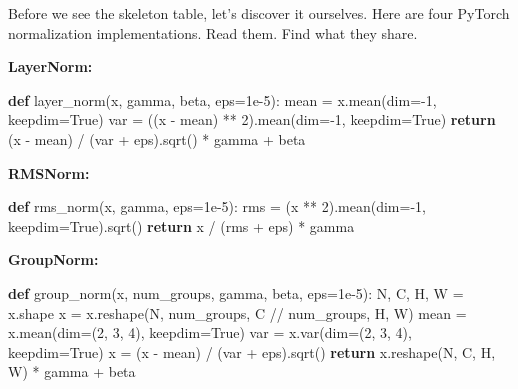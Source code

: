 \documentclass[11pt,titlepage]{article}
\newenvironment{Shaded}{}{}
\newcommand{\ControlFlowTok}[1]{\textcolor[rgb]{0.00,0.44,0.13}{\textbf{#1}}}
\newcommand{\DecValTok}[1]{\textcolor[rgb]{0.25,0.63,0.44}{#1}}
\newcommand{\FloatTok}[1]{\textcolor[rgb]{0.25,0.63,0.44}{#1}}
\newcommand{\KeywordTok}[1]{\textcolor[rgb]{0.00,0.44,0.13}{\textbf{#1}}}
\newcommand{\NormalTok}[1]{#1}
\newcommand{\OperatorTok}[1]{\textcolor[rgb]{0.40,0.40,0.40}{#1}}
\newcommand{\VariableTok}[1]{\textcolor[rgb]{0.10,0.09,0.49}{#1}}
\begin{document}
Before we see the skeleton table, let's discover it ourselves. Here are
four PyTorch normalization implementations. Read them. Find what they
share.

\textbf{LayerNorm:}

\begin{Shaded}
\begin{Highlighting}[]
\KeywordTok{def}\NormalTok{ layer_norm(x, gamma, beta, eps}\OperatorTok{=}\FloatTok{1e-5}\NormalTok{):}
\NormalTok{    mean }\OperatorTok{=}\NormalTok{ x.mean(dim}\OperatorTok{=-}\DecValTok{1}\NormalTok{, keepdim}\OperatorTok{=}\VariableTok{True}\NormalTok{)}
\NormalTok{    var }\OperatorTok{=}\NormalTok{ ((x }\OperatorTok{-}\NormalTok{ mean) }\OperatorTok{**} \DecValTok{2}\NormalTok{).mean(dim}\OperatorTok{=-}\DecValTok{1}\NormalTok{, keepdim}\OperatorTok{=}\VariableTok{True}\NormalTok{)}
    \ControlFlowTok{return}\NormalTok{ (x }\OperatorTok{-}\NormalTok{ mean) }\OperatorTok{/}\NormalTok{ (var }\OperatorTok{+}\NormalTok{ eps).sqrt() }\OperatorTok{*}\NormalTok{ gamma }\OperatorTok{+}\NormalTok{ beta}
\end{Highlighting}
\end{Shaded}

\textbf{RMSNorm:}

\begin{Shaded}
\begin{Highlighting}[]
\KeywordTok{def}\NormalTok{ rms_norm(x, gamma, eps}\OperatorTok{=}\FloatTok{1e-5}\NormalTok{):}
\NormalTok{    rms }\OperatorTok{=}\NormalTok{ (x }\OperatorTok{**} \DecValTok{2}\NormalTok{).mean(dim}\OperatorTok{=-}\DecValTok{1}\NormalTok{, keepdim}\OperatorTok{=}\VariableTok{True}\NormalTok{).sqrt()}
    \ControlFlowTok{return}\NormalTok{ x }\OperatorTok{/}\NormalTok{ (rms }\OperatorTok{+}\NormalTok{ eps) }\OperatorTok{*}\NormalTok{ gamma}
\end{Highlighting}
\end{Shaded}

\textbf{GroupNorm:}

\begin{Shaded}
\begin{Highlighting}[]
\KeywordTok{def}\NormalTok{ group_norm(x, num_groups, gamma, beta, eps}\OperatorTok{=}\FloatTok{1e-5}\NormalTok{):}
\NormalTok{    N, C, H, W }\OperatorTok{=}\NormalTok{ x.shape}
\NormalTok{    x }\OperatorTok{=}\NormalTok{ x.reshape(N, num_groups, C }\OperatorTok{//}\NormalTok{ num_groups, H, W)}
\NormalTok{    mean }\OperatorTok{=}\NormalTok{ x.mean(dim}\OperatorTok{=}\NormalTok{(}\DecValTok{2}\NormalTok{, }\DecValTok{3}\NormalTok{, }\DecValTok{4}\NormalTok{), keepdim}\OperatorTok{=}\VariableTok{True}\NormalTok{)}
\NormalTok{    var }\OperatorTok{=}\NormalTok{ x.var(dim}\OperatorTok{=}\NormalTok{(}\DecValTok{2}\NormalTok{, }\DecValTok{3}\NormalTok{, }\DecValTok{4}\NormalTok{), keepdim}\OperatorTok{=}\VariableTok{True}\NormalTok{)}
\NormalTok{    x }\OperatorTok{=}\NormalTok{ (x }\OperatorTok{-}\NormalTok{ mean) }\OperatorTok{/}\NormalTok{ (var }\OperatorTok{+}\NormalTok{ eps).sqrt()}
    \ControlFlowTok{return}\NormalTok{ x.reshape(N, C, H, W) }\OperatorTok{*}\NormalTok{ gamma }\OperatorTok{+}\NormalTok{ beta}
\end{Highlighting}
\end{Shaded}
\end{document}
